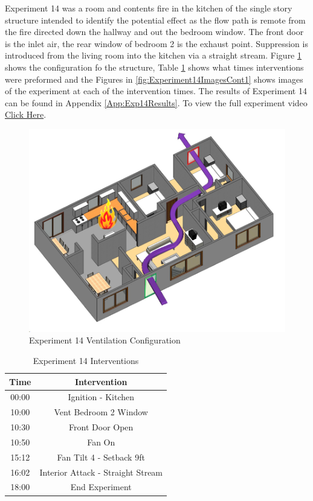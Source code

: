 \documentclass{article}
\begin{document}
Experiment 14 was a room and contents fire in the kitchen of the single story structure intended to identify the potential effect as the flow path is remote from the fire directed down the hallway and out the bedroom window. The front door is the inlet air, the rear window of bedroom 2 is the exhaust point. Suppression is introduced from the living room into the kitchen via a straight stream. Figure \ref{fig:Exp14VentConfig} shows the configuration fo the structure, Table \ref{Table:Exp14Interventions} shows what times interventions were preformed and the Figures in \ref{fig:Experiment14ImagesCont1} shows images of the experiment at each of the intervention times. The results of Experiment 14 can be found in Appendix \ref{App:Exp14Results}. To view the full experiment video \href{https://youtu.be/WzkDldq_ECA}{Click Here}.

\begin{figure}[H]
	\centering
	\includegraphics[width=5in]{0_Images/FireExperiments/Single_Story/Experiment_14.jpg}
	\caption{Experiment 14 Ventilation Configuration}
	\label{fig:Exp14VentConfig}
\end{figure}

\begin{table}[H]
	\centering
	\caption{Experiment 14 Interventions}
	\begin{tabular}{|c|c|} 
		\hline
		Time & Intervention \\ \hline \hline
		00:00 & Ignition - Kitchen \\ \hline
		10:00 & Vent Bedroom 2 Window \\ \hline
		10:30 & Front Door Open \\ \hline
		10:50 & Fan On \\ \hline
		15:12 & Fan Tilt 4 - Setback 9ft \\ \hline
		16:02 & Interior Attack - Straight Stream \\ \hline
		18:00 & End Experiment \\ \hline
	\end{tabular}
	\label{Table:Exp14Interventions}
\end{table}
\end{document}
